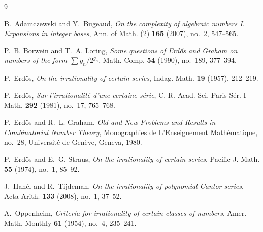 \documentclass[a4paper,10pt]{amsart}
\theoremstyle{remark}
\begin{document}
\begin{thebibliography}{9}

B.~Adamczewski and Y.~Bugeaud,
\emph{On the complexity of algebraic numbers I. Expansions in integer bases},
Ann. of Math. (2) \textbf{165} (2007), no.~2, 547--565.

P.~B. Borwein and T.~A. Loring,
\emph{Some questions of Erd\H{o}s and Graham on numbers of the form
$\sum g_n/2^{g_n}$},
Math. Comp. \textbf{54} (1990), no.~189, 377--394.

P.~Erd\H{o}s,
\emph{On the irrationality of certain series},
Indag. Math. \textbf{19} (1957), 212--219.

P.~Erd\H{o}s,
\emph{Sur l'irrationalit\'e d'une certaine s\'erie},
C. R. Acad. Sci. Paris S\'er. I Math. \textbf{292} (1981), no.~17, 765--768.

P.~Erd\H{o}s and R.~L. Graham,
\emph{Old and New Problems and Results in Combinatorial Number Theory},
Monographies de L'Enseignement Math\'ematique, no.~28,
Universit\'e de Gen\`eve, Geneva, 1980.

P.~Erd\H{o}s and E.~G. Straus,
\emph{On the irrationality of certain series},
Pacific J. Math. \textbf{55} (1974), no.~1, 85--92.

J.~Han\v{c}l and R.~Tijdeman,
\emph{On the irrationality of polynomial Cantor series},
Acta Arith. \textbf{133} (2008), no.~1, 37--52.

A.~Oppenheim,
\emph{Criteria for irrationality of certain classes of numbers},
Amer. Math. Monthly \textbf{61} (1954), no.~4, 235--241.

\end{thebibliography}
\end{document}
